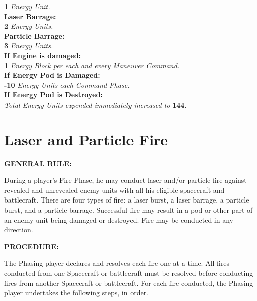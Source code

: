 \begin{table}[htbp]
{\begin{minipage}{0.95\textwidth}
\begin{multicols}{2}
      \textbf{1} \emph{Energy Unit.}\\ 
      \textbf{Laser Barrage:}\\
      \textbf{2} \emph{Energy Units.}\\ 
      \textbf{Particle Barrage:}\\
      \textbf{3} \emph{Energy Units.}\\ 
      \textbf{If Engine is damaged:}\\
      \textbf{1} \emph{Energy Block per each and every Maneuver Command.}\\
      \textbf{If Energy Pod is Damaged:}\\
      \textbf{-10} \emph{Energy Units each Command Phase.}\\
      \textbf{If Energy Pod is Destroyed:}\\
      \emph{Total Energy Units expended immediately increased to}
        \textbf{144}.
      \end{multicols}
    \end{minipage}}
\end{table}


\section{Laser and Particle Fire }
\label{sec:laser-particle-fire}



\noindent\textbf{GENERAL RULE:}

During a player's Fire Phase, he may conduct laser and/or particle
fire against revealed and unrevealed enemy units with all his eligible
spacecraft and battlecraft. There are four types of fire: a laser
burst, a laser barrage, a particle burst, and a particle barrage.
Successful fire may result in a pod or other part of an enemy unit
being damaged or destroyed. Fire may be conducted in any direction.

\medskip

\noindent\textbf{PROCEDURE:} 

The Phasing player declares and resolves each fire one at a time. All
fires conducted from one Spacecraft or battlecraft must be resolved
before conducting fires from another Spacecraft or battlecraft. For
each fire conducted, the Phasing player undertakes the following
steps, in order.

